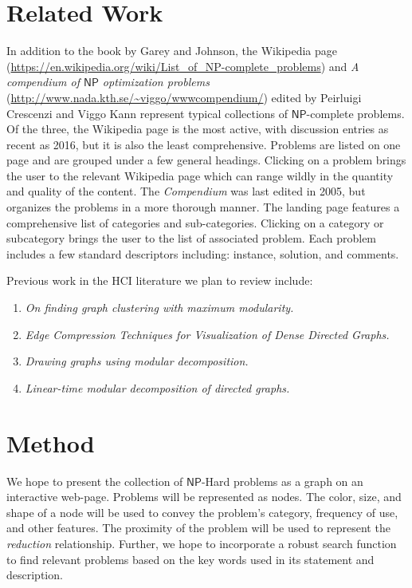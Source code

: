 \documentclass{sigchi}
\newcommand\ClassNP{\mathsf{NP}}
\begin{document}
\section{Related Work}
In addition to the book by Garey and Johnson, the Wikipedia page (\url{https://en.wikipedia.org/wiki/List_of_NP-complete_problems}) and \emph{A compendium of $\ClassNP$ optimization problems} (\url{http://www.nada.kth.se/~viggo/wwwcompendium/}) edited by Peirluigi Crescenzi and Viggo Kann represent typical collections of $\ClassNP$-complete problems. Of the three, the Wikipedia page is the most active, with discussion entries as recent as 2016, but it is also the least comprehensive. Problems are listed on one page and are grouped under a few general headings. Clicking on a problem brings the user to the relevant Wikipedia page which can range wildly in the quantity and quality of the content. The \emph{Compendium} was last edited in 2005, but organizes the problems in a more thorough manner. The landing page features a comprehensive list of categories and sub-categories. Clicking on a category or subcategory brings the user to the list of associated problem. Each problem includes a few standard descriptors including: instance, solution, and comments. 

Previous work in the HCI literature we plan to review include:
\begin{enumerate}
\item \emph{On finding graph clustering with maximum modularity.} \cite{brandes2007finding}
\item \emph{Edge Compression Techniques for Visualization of Dense Directed Graphs.} \cite{dwyer2013edge}
\item \emph{Drawing graphs using modular decomposition.} \cite{papadopoulos2005drawing}
\item \emph{Linear-time modular decomposition of directed graphs.} \cite{mcconnell2005linear}
\end{enumerate}

\section{Method}
We hope to present the collection of $\ClassNP$-Hard problems as a graph on an interactive web-page. Problems will be represented as nodes. The color, size, and shape of a node will be used to convey the problem's category, frequency of use, and other features. The proximity of the problem will be used to represent the \emph{reduction} relationship. Further, we hope to incorporate a robust search function to find relevant problems based on the key words used in its statement and description.   
\end{document}
